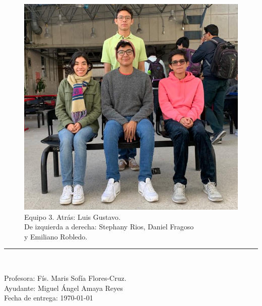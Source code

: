 \documentclass[letterpaper, 11 pt]{article}
\begin{document}
\begin{center}
\paragraph{}
\begin{figure}[H]
    \captionsetup{justification=centering,margin=2cm}
    \includegraphics[scale=0.23]{uwu.jpg}
    \centering
    \caption{Equipo 3. Atrás: Luis Gustavo. \\ De izquierda a derecha:  Stephany Rios, Daniel Fragoso \\ y Emiliano Robledo.}
\end{figure}
\rule{80mm}{0.1mm}\\
\begin{large}
Profesora:  Fís. Maris Sofía Flores-Cruz.  \\
Ayudante: Miguel Ángel Amaya Reyes \\
Fecha de entrega: \today\\
\end{large}
\end{center}


\newpage
\end{document}
